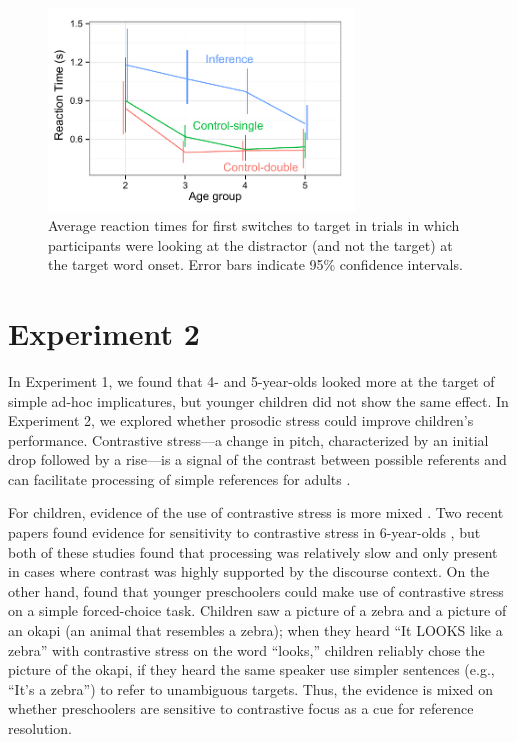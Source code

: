 \documentclass[10pt,letterpaper]{article}
\begin{document}
\begin{figure}
\begin{centering} 
\includegraphics[width=3.2in]{figures/expt1-rt.pdf}
\caption{\label{fig:rt} Average reaction times for first switches to target in trials in which participants were looking at the distractor (and not the target) at the target word onset. Error bars indicate 95\% confidence intervals.}
\end{centering} 
\end{figure}

\section{Experiment 2}

In Experiment 1, we found that 4- and 5-year-olds looked more at the target of simple ad-hoc implicatures, but younger children did not show the same effect. In Experiment 2, we explored whether prosodic stress could improve children's performance. Contrastive stress---a change in pitch, characterized by an initial drop followed by a rise---is a signal of the contrast between possible referents and can facilitate processing of simple references for adults \cite{ito2008anticipatory}.

For children, evidence of the use of contrastive stress is more mixed \cite{cutler1987}. Two recent papers found evidence for sensitivity to contrastive stress in 6-year-olds \cite{sekerina2012,ito2012}, but both of these studies found that processing was relatively slow and only present in cases where contrast was highly supported by the discourse context. On the other hand,  found that younger preschoolers could make use of contrastive stress on a simple forced-choice task. Children saw a picture of a zebra and a picture of an okapi (an animal that resembles a zebra); when they heard ``It LOOKS like a zebra'' with contrastive stress on the word ``looks,'' children reliably chose the picture of the okapi, if they heard the same speaker use simpler sentences (e.g., ``It's a zebra'') to refer to unambiguous targets. Thus, the evidence is mixed on whether preschoolers are sensitive to contrastive focus as a cue for reference resolution. 
\end{document}
